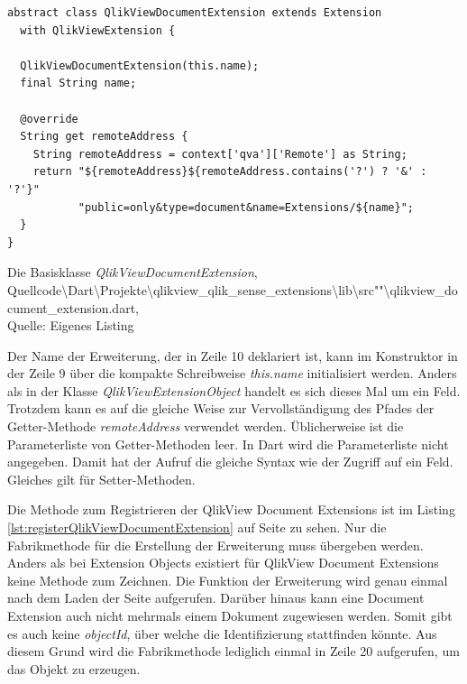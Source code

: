 \ifIncludeFigures\begin{listing}[htbp]
\begin{verbatim}
abstract class QlikViewDocumentExtension extends Extension
  with QlikViewExtension {

  QlikViewDocumentExtension(this.name);  
  final String name;

  @override
  String get remoteAddress {
    String remoteAddress = context['qva']['Remote'] as String;
    return "${remoteAddress}${remoteAddress.contains('?') ? '&' : '?'}"
           "public=only&type=document&name=Extensions/${name}";
  }
}
\end{verbatim}
\caption[Die Basisklasse \textit{QlikViewDocumentExtension}]{Die Basisklasse \textit{QlikViewDocumentExtension}, \\Quellcode\textbackslash{}Dart\textbackslash{}Projekte\textbackslash{}qlikview\_qlik\_sense\_extensions\textbackslash{}lib\textbackslash{}src""\textbackslash{}qlikview\_document\_extension.dart, \\Quelle: Eigenes Listing}
\label{lst:QlikViewDocumentExtension}
\end{listing}\fi

Der Name der Erweiterung, der in Zeile 10 deklariert ist, kann im Konstruktor in der Zeile 9 über die kompakte Schreibweise \textit{this.name} initialisiert werden. Anders als in der Klasse \textit{QlikViewExtensionObject} handelt es sich dieses Mal um ein Feld. Trotzdem kann es auf die gleiche Weise zur Vervollständigung des Pfades der Getter-Methode \textit{remoteAddress} verwendet werden. Üblicherweise ist die Parameterliste von Getter-Methoden leer. In Dart wird die Parameterliste nicht angegeben. Damit hat der Aufruf die gleiche Syntax wie der Zugriff auf ein Feld. Gleiches gilt für Setter-Methoden.



Die Methode zum Registrieren der QlikView Document Extensions ist im Listing \ref{lst:registerQlikViewDocumentExtension} auf Seite \pageref{lst:registerQlikViewDocumentExtension} zu sehen. Nur die Fabrikmethode für die Erstellung der Erweiterung muss übergeben werden. Anders als bei Extension Objects existiert für QlikView Document Extensions keine Methode zum Zeichnen. Die Funktion der Erweiterung wird genau einmal nach dem Laden der Seite aufgerufen. Darüber hinaus kann eine Document Extension auch nicht mehrmals einem Dokument zugewiesen werden. Somit gibt es auch keine \textit{objectId}, über welche die Identifizierung stattfinden könnte. Aus diesem Grund wird die Fabrikmethode lediglich einmal in Zeile 20 aufgerufen, um das Objekt zu erzeugen. 

